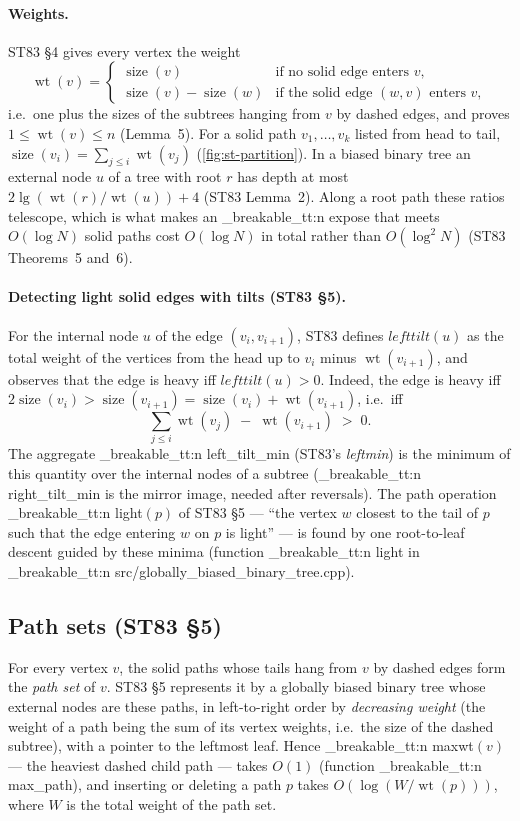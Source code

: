 \documentclass[11pt,a4paper,oneside]{report}
\theoremstyle{plain}
\theoremstyle{definition}
\theoremstyle{remark}
\DeclareRobustCommand{\code}[1]{\mtp_breakable_tt:n {#1}}
\DeclareRobustCommand{\file}[1]{\mtp_breakable_tt:n {#1}}
\newcommand{\size}{\operatorname{size}}
\newcommand{\wt}{\operatorname{wt}}
\begin{document}
\paragraph{Weights.} ST83 \S4 gives every vertex the weight
\[ \wt(v)=\begin{cases}\size(v) & \text{if no solid edge enters } v,\\
\size(v)-\size(w) & \text{if the solid edge } (w,v) \text{ enters } v,\end{cases} \]
i.e.\ one plus the sizes of the subtrees hanging from \(v\) by dashed edges, and proves
\(1\le\wt(v)\le n\) (Lemma~5). For a solid path \(v_1,\dots,v_k\) listed from head to tail,
\(\size(v_i)=\sum_{j\le i}\wt(v_j)\) (\cref{fig:st-partition}). In a biased binary tree an
external node \(u\) of a tree with root \(r\) has depth at most
\(2\lg(\wt(r)/\wt(u))+4\) (ST83 Lemma~2). Along a root path these ratios telescope, which is
what makes an \code{expose} that meets \(O(\log N)\) solid paths cost \(O(\log N)\) in total
rather than \(O(\log^2 N)\) (ST83 Theorems~5 and~6).

\paragraph{Detecting light solid edges with tilts (ST83 \S5).} For the internal node \(u\) of
the edge \((v_i,v_{i+1})\), ST83 defines \(\mathit{lefttilt}(u)\) as the total weight of the
vertices from the head up to \(v_i\) minus \(\wt(v_{i+1})\), and observes that the edge is heavy
iff \(\mathit{lefttilt}(u)>0\). Indeed, the edge is heavy iff
\(2\size(v_i)>\size(v_{i+1})=\size(v_i)+\wt(v_{i+1})\), i.e.\ iff
\[ \textstyle \sum_{j\le i}\wt(v_j)\;-\;\wt(v_{i+1})\;>\;0 . \]
The aggregate \code{left_tilt_min} (ST83's \emph{leftmin}) is the minimum of this quantity over
the internal nodes of a subtree (\code{right_tilt_min} is the mirror image, needed after
reversals). The path operation \code{light}\((p)\) of ST83 \S5 --- ``the vertex \(w\) closest
to the tail of \(p\) such that the edge entering \(w\) on \(p\) is light'' --- is found by one
root-to-leaf descent guided by these minima (function \code{light} in
\file{src/globally_biased_binary_tree.cpp}).

\subsection{Path sets (ST83 \S5)}
For every vertex \(v\), the solid paths whose tails hang from \(v\) by dashed edges form the
\emph{path set} of \(v\). ST83 \S5 represents it by a globally biased binary tree whose external
nodes are these paths, in left-to-right order by \emph{decreasing weight} (the weight of a path
being the sum of its vertex weights, i.e.\ the size of the dashed subtree), with a pointer to
the leftmost leaf. Hence \code{maxwt}\((v)\) --- the heaviest dashed child path --- takes
\(O(1)\) (function \code{max_path}), and inserting or deleting a path \(p\) takes
\(O(\log(W/\wt(p)))\), where \(W\) is the total weight of the path set.
\end{document}
